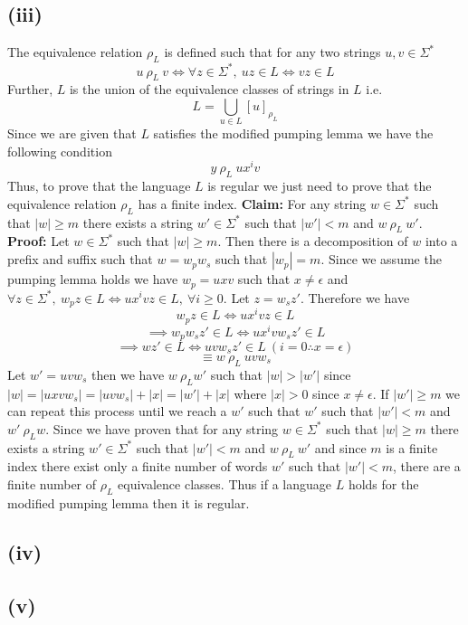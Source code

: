 \documentclass[12pt]{article}
\begin{document}
\subsection*{(iii)} The equivalence relation $\rho_L$ is defined such that
for any two strings $u, v \in \Sigma^*$
$$ u\ \rho_L\ v \iff \forall z \in \Sigma^*,\ uz \in L \iff vz \in L$$
Further, $L$ is the union of the equivalence classes of strings in $L$ i.e.
$$L = \bigcup _{u\in L} [u]_{\rho_L}$$
Since we are given that $L$ satisfies the modified pumping lemma we have the
following condition
$$y\ \rho_L\ ux^iv$$
Thus, to prove that the language $L$ is regular we just need to prove that the
equivalence relation $\rho_L$ has a finite index.
\newline
\textbf{Claim: } For any string $w \in \Sigma^*$ such that $|w| \ge m$ there
exists a string $w' \in \Sigma^*$ such that $|w'| < m$ and $w\ \rho_L\ w'$.
\newline
\textbf{Proof: } Let $w \in \Sigma^*$ such that $|w| \ge m$. Then there is a
decomposition of $w$ into a prefix and suffix such that $w = w_pw_s$ such that
$|w_p| = m$. Since we assume the pumping lemma holds we have $w_p = uxv$ such
that $x \neq \epsilon$ and
$\forall z \in \Sigma^*,\ w_pz \in L \iff ux^ivz \in L,\ \forall i \ge 0$.
Let $z = w_sz'$. Therefore we have
$$ w_pz \in L \iff ux^ivz \in L$$
$$\implies w_pw_sz' \in L \iff ux^ivw_sz' \in L$$
$$\implies wz' \in L \iff uvw_sz' \in L\ (i = 0 \therefore x = \epsilon)$$
$$\equiv w\ \rho_L\ uvw_s$$
Let $w' = uvw_s$ then we have $w\ \rho_L w'$ such that $|w| > |w'|$ since
$|w| = |uxvw_s| = |uvw_s|+|x| = |w'| +|x|$ where $|x| > 0$ since
$x \neq \epsilon$. If $|w'| \ge m$ we can repeat this process until we reach a
$w'$ such that $w'$ such that $|w'| < m$ and $w'\ \rho_L w$.
Since we have proven that for any string $w \in \Sigma^*$ such that $|w| \ge m$
there exists a string $w' \in \Sigma^*$ such that $|w'| < m$ and $w\ \rho_L\ w'$
and since $m$ is a finite index there exist only a finite number of words $w'$
such that $|w'| < m$, there are a finite number of $\rho_L$ equivalence classes.
Thus if a language $L$ holds for the modified pumping lemma then it is regular.

\subsection*{(iv)}
\subsection*{(v)}
\end{document}
